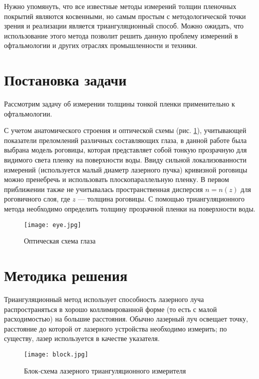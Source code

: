 Нужно упомянуть, что все известные методы измерений толщин пленочных покрытий являются косвенными, но самым простым с методологической точки зрения и реализации является триангуляционный способ. Можно ожидать, что использование этого метода позволит решить данную проблему измерений в офтальмологии и других отраслях промышленности и техники.

\section{Постановка задачи}
Рассмотрим задачу об измерении толщины тонкой пленки применительно к офтальмологии.


С учетом анатомического строения и оптической схемы (рис. \ref{ris:eye}), учитывающей показатели преломлений различных составляющих глаза, в данной работе была выбрана модель роговицы, которая представляет собой тонкую прозрачную для видимого света пленку на поверхности воды. Ввиду сильной локализованности измерений (используется малый диаметр лазерного пучка) кривизной роговицы можно пренебречь и использовать плоскопараллельную пленку. В первом приближении также не учитывалась пространственная дисперсия $n = n(z)$ для роговичного слоя, где $z$ --- толщина роговицы. С помощью триангуляционного метода необходимо определить толщину прозрачной пленки на поверхности воды.

\begin{figure}[h]
\begin{center}
\texttt{[image: eye.jpg]}
\end{center}
\caption{Оптическая схема глаза}
\label{ris:eye}
\end{figure}

\section{Методика решения}

Триангуляционный метод использует способность лазерного луча распространяться в хорошо коллимированной форме (то есть с малой расходимостью) на большие расстояния. Обычно лазерный луч освещает точку, расстояние до которой от лазерного устройства необходимо измерить; по существу, лазер используется в качестве \hbox{указателя.}

\begin{figure}[h]
\begin{center}
\texttt{[image: block.jpg]}
\end{center}
\caption{Блок-схема лазерного триангуляционного измерителя}
\label{ris: block}
\end{figure}

